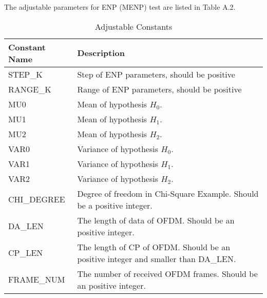 The adjustable parameters for ENP (MENP) test are listed in Table A.2. 
\begin{table}[h]
\begin{tabular}{l|p{350pt}} 
\hline
\hline
Constant Name & Description                                                                                           \\
\hline
STEP\_K       & Step of ENP parameters, should be positive                                                            \\
RANGE\_K      & Range of ENP parameters, should be positive                                                           \\
MU0		  &  Mean of hypothesis $H_0$.\\
MU1		  & Mean of hypothesis $H_1$.\\
MU2       & Mean of hypothesis $H_2$.\\
VAR0      &    Variance of hypothesis $H_0$.\\
VAR1		&	Variance of hypothesis $H_1$.\\
VAR2		&		Variance of hypothesis $H_2$.\\
CHI\_DEGREE   & Degree of freedom in Chi-Square Example. Should be a positive integer.                                \\
DA\_LEN       & The length of data of OFDM. Should be an positive integer.                      \\
CP\_LEN       & The length of CP of OFDM. Should be an positive integer and smaller than DA\_LEN. \\
FRAME\_NUM    & The number of received OFDM frames. Should be an positive integer.\\
\hline                                   
\end{tabular}
\label{constantlist}
\caption{Adjustable Constants}
\end{table}

